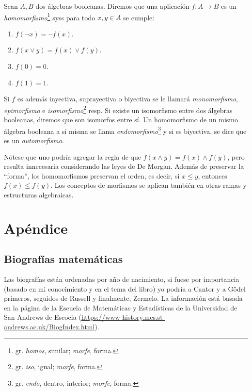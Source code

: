 \documentclass[11pt,a4paper]{book}
\begin{document}
\begin{mydef}[Morfismos]
	Sean $A,B$ dos álgebras booleanas. Diremos que una aplicación $f:A\rightarrow B$ es un \textit{homomorfismo}\footnote{gr. \textit{homos}, similar; \textit{morfe}, forma.} syss para todo $x,y\in A$ se cumple:
	\begin{enumerate}
		\item $f(\neg x)=\neg f(x)$.
		\item $f(x\vee y)=f(x)\vee f(y)$.
		\item $f(0)=0$.
		\item $f(1)=1$.
	\end{enumerate}
	Si $f$ es además inyectiva, suprayectiva o biyectiva se le llamará \textit{monomorfismo}, \textit{epimorfismo} e \textit{isomorfismo}\footnote{gr. \textit{iso}, igual; \textit{morfe}, forma.} resp. Si existe un isomorfismo entre dos álgebras booleanas, diremos que son isomorfos entre sí. Un homomorfismo de un mismo álgebra booleana a sí misma se llama \textit{endomorfismo}\footnote{gr. \textit{endo}, dentro, interior; \textit{morfe}, forma.} y si es biyectiva, se dice que es un \textit{automorfismo}.
\end{mydef}
Nótese que uno podría agregar la regla de que $f(x\wedge y)=f(x)\wedge f(y)$, pero resulta innecesaria considerando las leyes de De Morgan. Además de preservar la ``forma'', los homomorfismos preservan el orden, es decir, si $x\leq y$, entonces $f(x)\leq f(y)$. Los conceptos de morfismos se aplican también en otras ramas y estructuras algebraicas.

\appendix
\part*{Apéndice}
\chapter{Biografías matemáticas}
Las biografías están ordenadas por año de nacimiento, si fuese por importancia (basado en mi conocimiento y en el tema del libro) yo podría a Cantor y a Gödel primeros, seguidos de Russell y finalmente, Zermelo. La información está basada en la página de la Escuela de Matemáticas y Estadísticas de la Universidad de San Andrews de Escocia (\url{https://www-history.mcs.st-andrews.ac.uk/BiogIndex.html}).
\end{document}
